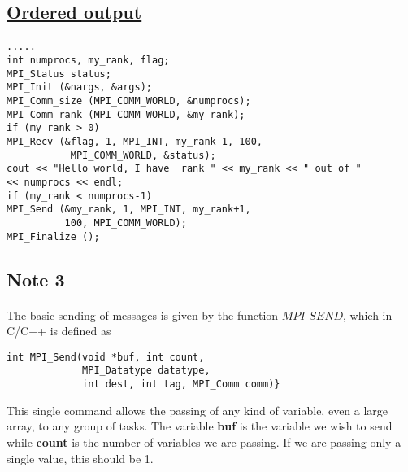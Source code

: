\documentclass[%
oneside,                 %
final,                   %
10pt]{article}
\begin{document}
\subsection*{\href{{https://github.com/CompPhysics/ComputationalPhysics2/blob/gh-pages/doc/Programs/LecturePrograms/programs/MPI/chapter07/program4.cpp}}{Ordered output}}

\paragraph{}


\begin{Verbatim}[numbers=none,fontsize=\fontsize{9pt}{9pt},baselinestretch=0.95]
.....
int numprocs, my_rank, flag;
MPI_Status status;
MPI_Init (&nargs, &args);
MPI_Comm_size (MPI_COMM_WORLD, &numprocs);
MPI_Comm_rank (MPI_COMM_WORLD, &my_rank);
if (my_rank > 0)
MPI_Recv (&flag, 1, MPI_INT, my_rank-1, 100, 
           MPI_COMM_WORLD, &status);
cout << "Hello world, I have  rank " << my_rank << " out of " 
<< numprocs << endl;
if (my_rank < numprocs-1)
MPI_Send (&my_rank, 1, MPI_INT, my_rank+1, 
          100, MPI_COMM_WORLD);
MPI_Finalize ();
\end{Verbatim}




\subsection*{Note 3}

\paragraph{}


The basic sending of messages is given by the function $MPI\_SEND$, which in C/C++
is defined as 
\begin{verbatim}
int MPI_Send(void *buf, int count, 
             MPI_Datatype datatype, 
             int dest, int tag, MPI_Comm comm)}
\end{verbatim}
This single command allows the passing of any kind of variable, even a large array, to any group of tasks. 
The variable \textbf{buf} is the variable we wish to send while \textbf{count}
is the  number of variables we are passing. If we are passing only a single value, this should be 1. 
\end{document}
